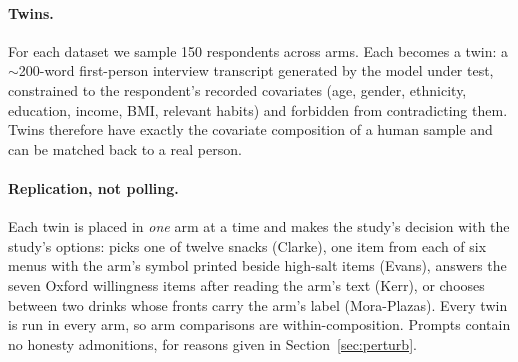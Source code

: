 \documentclass[10pt,twocolumn]{article}
\begin{document}
\begin{table}[t]\centering\small
\caption{Datasets. Ceiling = split-half Spearman correlation between segment-level arm rankings computed on two random halves of the human sample (gender$\times$age-band segments). Pooled baseline = correlation obtained by predicting every segment with the whole-population ranking.}
\label{tab:data}
\end{table}

\paragraph{Twins.} For each dataset we sample 150 respondents across arms. Each becomes a twin: a $\sim$200-word first-person interview transcript generated by the model under test, constrained to the respondent's recorded covariates (age, gender, ethnicity, education, income, BMI, relevant habits) and forbidden from contradicting them. Twins therefore have exactly the covariate composition of a human sample and can be matched back to a real person.

\paragraph{Replication, not polling.} Each twin is placed in \emph{one} arm at a time and makes the study's decision with the study's options: picks one of twelve snacks (Clarke), one item from each of six menus with the arm's symbol printed beside high-salt items (Evans), answers the seven Oxford willingness items after reading the arm's text (Kerr), or chooses between two drinks whose fronts carry the arm's label (Mora-Plazas). Every twin is run in every arm, so arm comparisons are within-composition. Prompts contain no honesty admonitions, for reasons given in Section~\ref{sec:perturb}.
\end{document}
